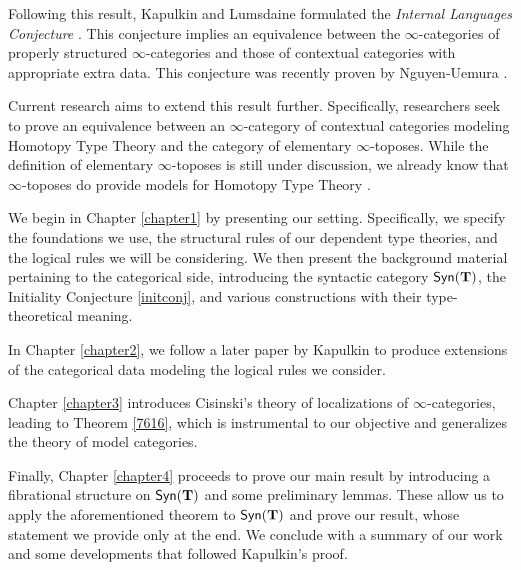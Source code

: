 Following this result, Kapulkin and Lumsdaine formulated the \emph{Internal
Languages Conjecture} \cite[Conj.\ 3.7]{KL16}. This conjecture implies an equivalence between
the $\infty$-categories of properly structured $\infty$-categories and those
of contextual categories with appropriate extra data. This conjecture
was recently proven by Nguyen-Uemura \cite{NU22}. 

Current research aims to
extend this result further. Specifically, researchers seek to prove an equivalence between an $\infty$-category of
contextual categories modeling Homotopy Type Theory and the category of elementary
$\infty$-toposes. While the definition of elementary $\infty$-toposes is still under discussion,
we already know that $\infty$-toposes do provide models for Homotopy Type Theory \cite{Shu19}.

\begin{organization}
  We begin in Chapter \ref{chapter1} by presenting our setting. Specifically, 
  we specify the foundations we use, the structural rules of our dependent type 
  theories, and the logical rules we will be considering. We then present the 
  background material pertaining to the categorical side, introducing the 
  syntactic category $\mathsf{Syn}(\mathbf{T})$, the Initiality Conjecture \ref{initconj}, and 
  various constructions with their type-theoretical meaning.
  
  In Chapter \ref{chapter2}, we follow a later paper by Kapulkin \cite{Kap17} 
  to produce extensions of the categorical data modeling the logical rules we 
  consider.
  
  Chapter \ref{chapter3} introduces Cisinski's theory of localizations of 
  $\infty$-categories, leading to Theorem \ref{7616}, which is instrumental to 
  our objective and generalizes the theory of model categories.
  
  Finally, Chapter \ref{chapter4} proceeds to prove our main result by 
  introducing a fibrational structure on $\mathsf{Syn}(\mathbf{T})$ \cite{AKL15} and some 
  preliminary lemmas. These allow us to apply the aforementioned theorem to 
  $\mathsf{Syn}(\mathbf{T})$ and prove our result, whose statement we provide only at the end. 
  We conclude with a summary of our work and some developments that followed 
  Kapulkin's proof.
\end{organization}

